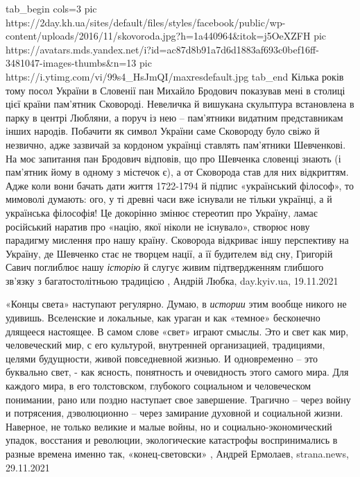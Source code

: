 \ifcmt
  tab_begin cols=3
     pic https://2day.kh.ua/sites/default/files/styles/facebook/public/wp-content/uploads/2016/11/skovoroda.jpg?h=1a440964&itok=j5OeXZFH
		 pic https://avatars.mds.yandex.net/i?id=ac87d8b91a7d6d1883af693c0bef16ff-3481047-images-thumbs&n=13
     pic https://i.ytimg.com/vi/99s4_HsJmQI/maxresdefault.jpg
  tab_end
\fi
Кілька років тому посол України в Словенії пан Михайло Бродович показував мені
в столиці цієї країни пам’ятник Сковороді. Невеличка й вишукана скульптура
встановлена в парку в центрі Любляни, а поруч із нею – пам’ятники видатним
представникам інших народів. Побачити як символ України саме Сковороду було
свіжо й незвично, адже зазвичай за кордоном українці ставлять пам’ятники
Шевченкові.  На моє запитання пан Бродович відповів, що про Шевченка словенці
знають (і пам’ятник йому в одному з містечок є), а от Сковорода став для них
відкриттям.  Адже коли вони бачать дати життя 1722-1794 й підпис «український
філософ», то мимоволі думають: ого, у ті древні часи вже існували не тільки
українці, а й українська філософія! Це докорінно змінює стереотип про Україну,
ламає російський наратив про «націю, якої ніколи не існувало», створює нову
парадигму мислення про нашу країну. Сковорода відкриває іншу перспективу на
Україну, де Шевченко стає не творцем нації, а її будителем від сну, Григорій
Савич поглиблює нашу \emph{історію} й слугує живим підтвердженням глибшого
зв’язку з багатостолітньою традицією
, 
Андрій Любка, day.kyiv.ua, 19.11.2021

«Концы света» наступают регулярно. Думаю, в \emph{истории} этим вообще никого
не удивишь. Вселенские и локальные, как ураган и как «темное» бесконечно
длящееся настоящее. В самом слове «свет» играют смыслы. Это и свет как мир,
человеческий мир, с его культурой, внутренней организацией, традициями, целями
будущности, живой повседневной жизнью. И одновременно – это буквально свет, -
как ясность, понятность и очевидность этого самого мира. Для каждого мира, в
его толстовском, глубокого социальном и человеческом понимании, рано или поздно
наступает свое завершение. Трагично – через войну и потрясения, дэволюционно –
через замирание духовной и социальной жизни.  Наверное, не только великие и
малые войны, но и социально-экономический упадок, восстания и революции,
экологические катастрофы воспринимались в разные времена именно так,
«конец-световски»
, Андрей Ермолаев, strana.news, 29.11.2021
